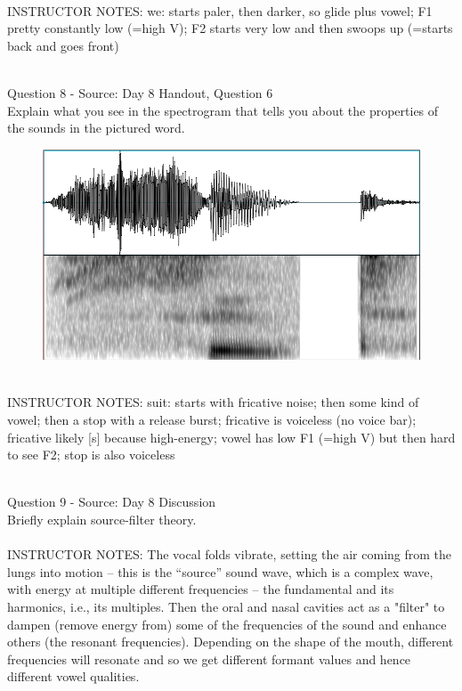 \documentclass[12pt]{article}
\begin{document}
~\\
INSTRUCTOR NOTES: we: starts paler, then darker, so glide plus vowel; F1 pretty constantly low (=high V); F2 starts very low and then swoops up (=starts back and goes front)


~\\

{\large Question 8} - Source: Day 8 Handout, Question 6\\

Explain what you see in the spectrogram that tells you about the properties of the sounds in the pictured word.\\

\begin{figure}[H]
\includegraphics{../images/spectrogram_suit.png}
\end{figure}

~\\
INSTRUCTOR NOTES: suit: starts with fricative noise; then some kind of vowel; then a stop with a release burst; fricative is voiceless (no voice bar); fricative likely [s] because high-energy; vowel has low F1 (=high V) but then hard to see F2; stop is also voiceless


~\\

{\large Question 9} - Source: Day 8 Discussion\\

Briefly explain source-filter theory.\\


~\\
INSTRUCTOR NOTES: The vocal folds vibrate, setting the air coming from the lungs into motion -- this is the ``source'' sound wave, which is a complex wave, with energy at multiple different frequencies – the fundamental and its harmonics, i.e., its multiples. Then the oral and nasal cavities act as a "filter" to dampen (remove energy from) some of the frequencies of the sound and enhance others (the resonant frequencies). Depending on the shape of the mouth, different frequencies will resonate and so we get different formant values and hence different vowel qualities.
\end{document}
